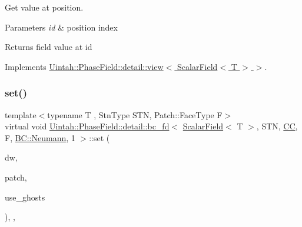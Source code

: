 Get value at position. 


\begin{DoxyParams}{Parameters}
{\em id} & position index \\
\hline
\end{DoxyParams}
\begin{DoxyReturn}{Returns}
field value at id 
\end{DoxyReturn}


Implements \hyperlink{classUintah_1_1PhaseField_1_1detail_1_1view_3_01ScalarField_3_01T_01_4_01_4_aea43cfedfe3b6f3c038ff795caec49b8}{Uintah\+::\+Phase\+Field\+::detail\+::view$<$ Scalar\+Field$<$ T $>$ $>$}.

\mbox{\label{classUintah_1_1PhaseField_1_1detail_1_1bc__fd_3_01ScalarField_3_01T_01_4_00_01STN_00_01CC_00_01F_00_01BC_1_1Neumann_00_011_01_4_a94ada060ff3ae2ef6a8d3c52410d26ea}} 
\subsubsection{\texorpdfstring{set()}{set()}\hspace{0.1cm}{\footnotesize\ttfamily [1/2]}}
{\footnotesize\ttfamily template$<$typename T , Stn\+Type S\+TN, Patch\+::\+Face\+Type F$>$ \\
virtual void \hyperlink{classUintah_1_1PhaseField_1_1detail_1_1bc__fd}{Uintah\+::\+Phase\+Field\+::detail\+::bc\+\_\+fd}$<$ \hyperlink{structUintah_1_1PhaseField_1_1ScalarField}{Scalar\+Field}$<$ T $>$, S\+TN, \hyperlink{namespaceUintah_1_1PhaseField_a33d355affda78a83f45755ba8388cedda22303704507d024d1d6508ed9859a85a}{CC}, F, \hyperlink{namespaceUintah_1_1PhaseField_a148fba372aa3be96fd6eede7a2fa10b5ab8537a769dbc90cb1762215441212152}{B\+C\+::\+Neumann}, 1 $>$\+::set (\begin{DoxyParamCaption}\item[{Data\+Warehouse $\ast$}]{dw,  }\item[{const Patch $\ast$}]{patch,  }\item[{bool}]{use\+\_\+ghosts }\end{DoxyParamCaption})\hspace{0.3cm}{\ttfamily [inline]}, {\ttfamily [override]}, {\ttfamily [virtual]}}



